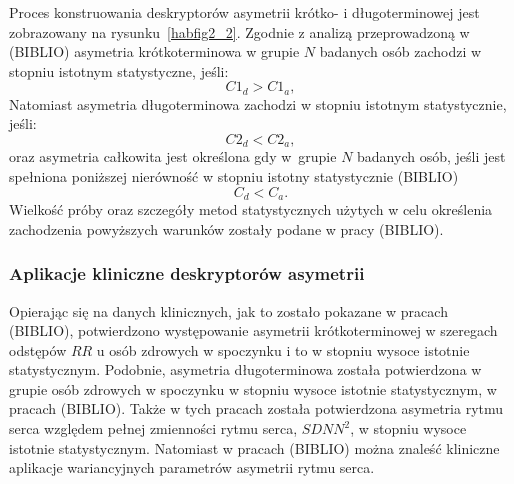 Proces konstruowania deskryptorów asymetrii krótko- i długoterminowej jest zobrazowany na
rysunku~\ref{habfig2_2}{.}
Zgodnie z analizą przeprowadzoną w (BIBLIO) asymetria krótkoterminowa w grupie $N$
badanych osób zachodzi w stopniu istotnym statystyczne, jeśli: 
\begin{equation}
C1_{d}>C1_{a},
\end{equation} 
Natomiast asymetria długoterminowa zachodzi w stopniu istotnym statystycznie, jeśli:
\begin{equation}
C2_{d}<C2_{a},
\end{equation}
oraz asymetria całkowita jest określona gdy w~grupie $N$ badanych osób, jeśli jest
spełniona poniższej nierówność w stopniu istotny statystycznie (BIBLIO) %
\begin{equation}
C_{d}<C_{a}.
\end{equation}
Wielkość próby oraz szczegóły metod statystycznych użytych w celu określenia zachodzenia
powyższych warunków zostały podane w pracy (BIBLIO).

\subsubsection{Aplikacje kliniczne deskryptorów asymetrii}

Opierając się na danych klinicznych, jak to zostało pokazane w pracach (BIBLIO), 
potwierdzono występowanie asymetrii krótkoterminowej w szeregach odstępów $RR$ u osób 
zdrowych w spoczynku i to w stopniu wysoce istotnie statystycznym. Podobnie, asymetria
długoterminowa została potwierdzona w grupie osób zdrowych w spoczynku w stopniu wysoce
istotnie statystycznym, w pracach (BIBLIO). Także w tych pracach została potwierdzona
asymetria rytmu serca względem pełnej zmienności rytmu serca, $SDNN^2$, w stopniu wysoce
istotnie statystycznym. Natomiast w pracach (BIBLIO) można znaleść kliniczne aplikacje
wariancyjnych parametrów asymetrii rytmu serca.

